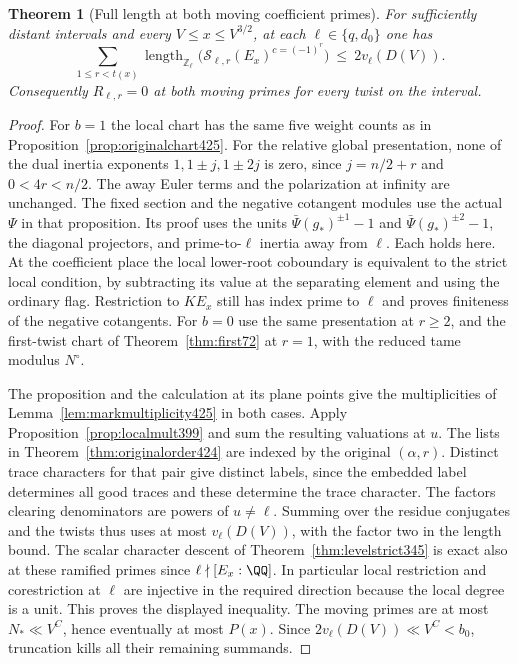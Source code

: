 \documentclass[a4paper,11pt]{article}
\newtheorem{theorem}[proposition]{Theorem}
\theoremstyle{definition}
\theoremstyle{remark}
\newcommand{\ZZ}{\mathbb Z}\newcommand{\ord}{\operatorname{ord}}
\numberwithin{equation}{section}
\begin{document}
\begin{theorem}[Full length at both moving coefficient primes]\leavevmode
\label{thm:movingprimes428}
For sufficiently distant intervals and every \(V\le x\le V^{3/2}\),
at each \(\ell\in\{q,d_0\}\) one has
\[
  \sum_{1\le r<t(x)}
       \operatorname{length}_{\ZZ_\ell}
          \bigl(\mathcal S_{\ell,r}(E_x)^{c=(-1)^r}\bigr)
            \ \le\ 2 v_\ell(D(V)).
\]
Consequently \(R_{\ell,r}=0\) at both moving primes for every
twist on the interval.
\end{theorem}
\begin{proof}
For \(b=1\) the local chart has the same five weight counts
as in Proposition~\ref{prop:originalchart425}. For the
relative global presentation, none of the dual inertia
exponents \(1,1\pm j,1\pm 2j\) is zero, since
\(j=n/2+r\) and \(0<4r<n/2\). The away Euler terms and the
polarization at infinity are unchanged. The fixed section
and the negative cotangent modules use the actual \(\Psi\)
in that proposition. Its proof uses the units
\(\bar\Psi(g_*)^{\pm1}-1\) and \(\bar\Psi(g_*)^{\pm2}-1\),
the diagonal projectors, and prime-to-\(\ell\) inertia away
from \(\ell\). Each holds here. At the coefficient place the
local lower-root coboundary is equivalent to the strict local
condition, by subtracting its value at the separating element
and using the ordinary flag. Restriction to \(K E_x\) still
has index prime to \(\ell\) and proves finiteness of the
negative cotangents. For \(b=0\) use the same presentation
at \(r\ge2\), and the first-twist chart of Theorem~\ref{thm:first72}
at \(r=1\), with the reduced tame modulus \(N^\circ\).

The proposition and the calculation at its plane points
give the multiplicities of Lemma~\ref{lem:markmultiplicity425}
in both cases. Apply Proposition~\ref{prop:localmult399}
and sum the resulting valuations at \(u\). The lists in
Theorem~\ref{thm:originalorder424} are indexed by the original
\((\alpha,r)\). Distinct trace characters for that pair give
distinct labels, since the embedded label determines all
good traces and these determine the trace character. The
factors clearing denominators are powers of \(u\ne\ell\).
Summing over the residue conjugates and the twists thus uses
at most \(v_\ell(D(V))\), with the factor two in the length
bound. The scalar character descent of
Theorem~\ref{thm:levelstrict345} is exact also at these
ramified primes since \(\ell\nmid[E_x:\QQ]\). In particular
local restriction and corestriction at \(\ell\) are injective
in the required direction because the local degree is a unit.
This proves the displayed inequality. The moving primes are
at most \(N_*\ll V^C\), hence eventually at most \(P(x)\).
Since \(2v_\ell(D(V))\ll V^C<b_0\), truncation kills all
their remaining summands.
\end{proof}
\end{document}
